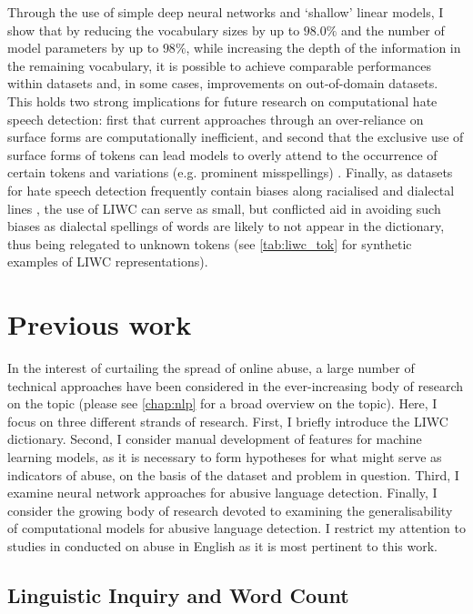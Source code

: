 Through the use of simple deep neural networks and `shallow' linear models, I show that by reducing the vocabulary sizes by up to $98.0\%$ and the number of model parameters by up to $98\%$, while increasing the depth of the information in the remaining vocabulary, it is possible to achieve comparable performances within datasets and, in some cases, improvements on out-of-domain datasets. 
This holds two strong implications for future research on computational hate speech detection: first that current approaches through an over-reliance on surface forms are computationally inefficient, and second that the exclusive use of surface forms of tokens can lead models to overly attend to the occurrence of certain tokens and variations (e.g. prominent misspellings) \citep{Rottger:2021}.
Finally, as datasets for hate speech detection frequently contain biases along racialised and dialectal lines \citep{Waseem:2018,Davidson:2019}, the use of LIWC can serve as small, but conflicted aid in avoiding such biases as dialectal spellings of words are likely to not appear in the dictionary, thus being relegated to unknown tokens (see \cref{tab:liwc_tok} for synthetic examples of LIWC representations).

\section{Previous work}

In the interest of curtailing the spread of online abuse, a large number of technical approaches have been considered in the ever-increasing body of research on the topic (please see \cref{chap:nlp} for a broad overview on the topic).
Here, I focus on three different strands of research. 
First, I briefly introduce the LIWC dictionary. 
Second, I consider manual development of features for machine learning models, as it is necessary to form hypotheses for what might serve as indicators of abuse, on the basis of the dataset and problem in question. 
Third, I examine neural network approaches for abusive language detection. 
Finally, I consider the growing body of research devoted to examining the generalisability of computational models for abusive language detection. 
I restrict my attention to studies in conducted on abuse in English as it is most pertinent to this work.

\subsection{Linguistic Inquiry and Word Count}

